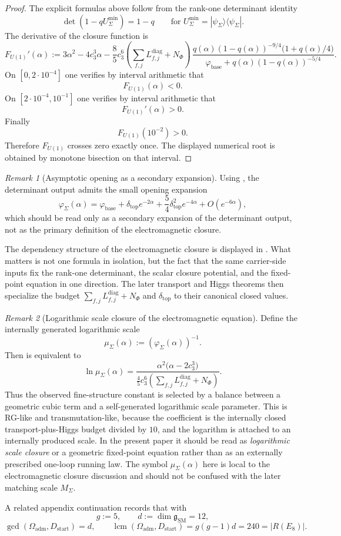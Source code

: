 \documentclass[11pt,a4paper]{article}
\theoremstyle{definition}
\theoremstyle{remark}
\newtheorem*{remark}{Remark}
\newcommand{\cthree}{c_3}
\newcommand{\phibase}{\varphi_{\mathrm{base}}}
\newcommand{\phiseam}{\varphi_{\Sigma}}
\newcommand{\deltatop}{\delta_{\mathrm{top}}}
\newcommand{\SM}{\mathrm{SM}}
\newcommand{\Oadm}{\Omega_{\mathrm{adm}}}
\newcommand{\Dstart}{D_{\mathrm{start}}}
\begin{document}
\begin{proof}
The explicit formulas above follow from the rank-one determinant identity
\[
\det(1-qU_{\Sigma}^{\min})=1-q
\qquad
\text{for } U_{\Sigma}^{\min}=|\psi_{\Sigma}\rangle\langle\psi_{\Sigma}|.
\]
The derivative of the closure function is
\[
F_{U(1)}'(\alpha)
:=
3\alpha^2-4\cthree^3\alpha
-\frac85\cthree^6\left(\sum_{f,j}L_{f,j}^{\mathrm{diag}}+N_\Phi\right)\,
\frac{q(\alpha)(1-q(\alpha))^{-9/4}\bigl(1+q(\alpha)/4\bigr)}
{\phibase+q(\alpha)(1-q(\alpha))^{-5/4}}.
\]
On $[0,2\cdot 10^{-4}]$ one verifies by interval arithmetic that
\[
F_{U(1)}(\alpha)<0.
\]
On $[2\cdot 10^{-4},10^{-1}]$ one verifies by interval arithmetic that
\[
F_{U(1)}'(\alpha)>0.
\]
Finally
\[
F_{U(1)}(10^{-2})>0.
\]
Therefore $F_{U(1)}$ crosses zero exactly once. The displayed numerical root is obtained by
monotone bisection on that interval.
\end{proof}

\begin{remark}[Asymptotic opening as a secondary expansion]
Using , the determinant output admits the small
opening expansion
\[
\phiseam(\alpha)
=
\phibase
+\deltatop e^{-2\alpha}
+\frac54\deltatop^2e^{-4\alpha}
+O(e^{-6\alpha}),
\]
which should be read only as a secondary expansion of the determinant output, not as the primary
definition of the electromagnetic closure.
\end{remark}

The dependency structure of the electromagnetic closure is displayed in
. What matters is not one formula in isolation, but the fact that
the same carrier-side inputs fix the rank-one determinant, the scalar closure potential, and the
fixed-point equation in one direction. The later transport and Higgs theorems then specialize the
budget $\sum_{f,j}L_{f,j}^{\mathrm{diag}}+N_\Phi$ and $\deltatop$ to their canonical closed values.
\begin{remark}[Logarithmic scale closure of the electromagnetic equation]
Define the internally generated logarithmic scale
\[
\mu_\Sigma(\alpha):=(\phiseam(\alpha))^{-1}.
\]
Then  is equivalent to
\[
\ln \mu_\Sigma(\alpha)
=
\frac{\alpha^2\bigl(\alpha-2\cthree^3\bigr)}
{\frac45\cthree^6\left(\sum_{f,j}L_{f,j}^{\mathrm{diag}}+N_\Phi\right)}.
\]
Thus the observed fine-structure constant is selected by a balance between a geometric cubic term
and a self-generated logarithmic scale parameter. This is RG-like and transmutation-like,
because the coefficient is the internally closed transport-plus-Higgs budget divided by $10$, and
the logarithm is attached to an internally produced scale. In the present paper it should be read
as \emph{logarithmic scale closure} or a geometric fixed-point equation rather than as an externally
prescribed one-loop running law. The symbol $\mu_\Sigma(\alpha)$ here is local to the
electromagnetic closure discussion and should not be confused with the later matching scale
$M_\Sigma$.
\end{remark}
A related appendix continuation records that with
\[
g:=5,
\qquad
d:=\dim \mathfrak g_{\SM}=12,
\]
\[
\gcd(\Oadm,\Dstart)=d,
\qquad
\operatorname{lcm}(\Oadm,\Dstart)=g(g-1)d=240=|R(E_8)|.
\]
\end{document}
